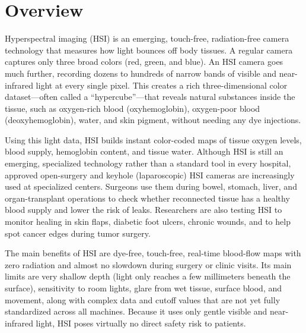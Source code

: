 \label{ch:infographic-hsi}

\section{Overview}

Hyperspectral imaging (HSI) is an emerging, touch-free, radiation-free camera technology that measures how light bounces off body tissues. A regular camera captures only three broad colors (red, green, and blue). An HSI camera goes much further, recording dozens to hundreds of narrow bands of visible and near-infrared light at every single pixel. This creates a rich three-dimensional color dataset---often called a ``hypercube''---that reveals natural substances inside the tissue, such as oxygen-rich blood (oxyhemoglobin), oxygen-poor blood (deoxyhemoglobin), water, and skin pigment, without needing any dye injections.

Using this light data, HSI builds instant color-coded maps of tissue oxygen levels, blood supply, hemoglobin content, and tissue water. Although HSI is still an emerging, specialized technology rather than a standard tool in every hospital, approved open-surgery and keyhole (laparoscopic) HSI cameras are increasingly used at specialized centers. Surgeons use them during bowel, stomach, liver, and organ-transplant operations to check whether reconnected tissue has a healthy blood supply and lower the risk of leaks. Researchers are also testing HSI to monitor healing in skin flaps, diabetic foot ulcers, chronic wounds, and to help spot cancer edges during tumor surgery.

The main benefits of HSI are dye-free, touch-free, real-time blood-flow maps with zero radiation and almost no slowdown during surgery or clinic visits. Its main limits are very shallow depth (light only reaches a few millimeters beneath the surface), sensitivity to room lights, glare from wet tissue, surface blood, and movement, along with complex data and cutoff values that are not yet fully standardized across all machines. Because it uses only gentle visible and near-infrared light, HSI poses virtually no direct safety risk to patients.

